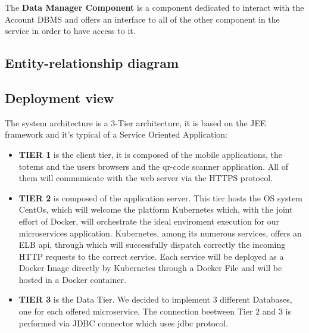 The \textbf{Data Manager Component} is a component dedicated to interact with the Account DBMS and offers an interface to all of the other component in the service in order to have access to it. 

\subsection{Entity-relationship diagram}
\label{subsect:entityrelationshipdiagram}

\subsection{Deployment view}
\label{subsect:deploymentview}

The system architecture is a 3-Tier architecture, it is based on the JEE framework and it's typical of a Service Oriented Application:

\begin{itemize}[topsep=0pt]
    \item \textbf{TIER 1} is the client tier, it is composed of the mobile applications, the totems and the users browsers and the qr-code scanner application. All of them will communicate with the web server via the HTTPS protocol.
    \item \textbf{TIER 2} is composed of the application server. This tier hosts the OS system CentOs, which will welcome the platform Kubernetes which, with the joint effort of Docker, will orchestrate the ideal enviroment execution for our microservices application. Kubernetes, among its numerous services, offers an ELB api, through which will successfully dispatch correctly the incoming HTTP requests to the correct service. Each service will be deployed as a Docker Image directly by Kubernetes through a Docker File and will be hosted in a Docker container.
    \item \textbf{TIER 3} is the Data Tier. 
    We decided to implement 3 different Databases, one for each offered microservice. 
    The connection beetween Tier 2 and 3 is performed via JDBC connector which uses jdbc protocol.
\end{itemize}

